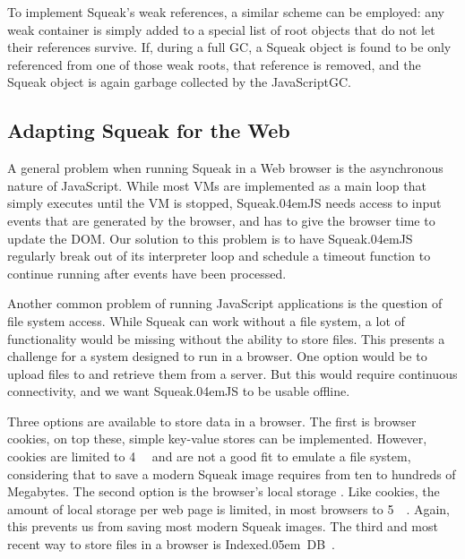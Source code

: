 \documentclass[natbib]{sigplanconf}
\newcommand*\SqueakJS{Squeak\texorpdfstring{\kern.04em}{}JS\xspace}
\newcommand*\JS{JavaScript\xspace}
\newcommand*\IndexedDB{\mbox{Indexed\kern.05em DB}\xspace}
\begin{document}
To implement Squeak's weak references, a similar scheme can be
employed: any weak container is simply added to a special list of root
objects that do not let their references survive. If, during a full
\ac{GC}, a Squeak object is found to be only referenced from one of
those weak roots, that reference is removed, and the Squeak object is
again garbage collected by the \JS \ac{GC}.

\subsection{Adapting Squeak for the Web}
\label{sec:adapting-for-web}

A general problem when running Squeak in a Web browser is the
asynchronous nature of \JS. While most \acp{VM} are implemented as a
main loop that simply executes until the \ac{VM} is stopped, \SqueakJS
needs access to input events that are generated by the browser, and
has to give the browser time to update the \ac{DOM}. Our solution to
this problem is to have \SqueakJS regularly break out of its
interpreter loop and schedule a timeout function to continue running
after events have been processed.

Another common problem of running \JS applications is the question of
file system access. While Squeak can work without a file system, a lot
of functionality would be missing without the ability to store
files. This presents a challenge for a system designed to run in a
browser. One option would be to upload files to and retrieve them from
a server. But this would require continuous connectivity, and we want
\SqueakJS to be usable offline.

Three options are available to store data in a browser. The first is
browser cookies, on top these, simple key-value stores can be
implemented. However, cookies are limited to \SI{4}{\kilo\byte} and
are not a good fit to emulate a file system, considering that to save
a modern Squeak image requires from ten to hundreds of Megabytes. The
second option is the browser's local storage \cite{hickson2013web}.
Like cookies, the amount of local storage per web page is limited, in
most browsers to \SI{5}{\mega\byte}. Again, this prevents us from
saving most modern Squeak images. The third and most recent way to
store files in a browser is \IndexedDB~\cite{mehta2013indexed}.
\end{document}

